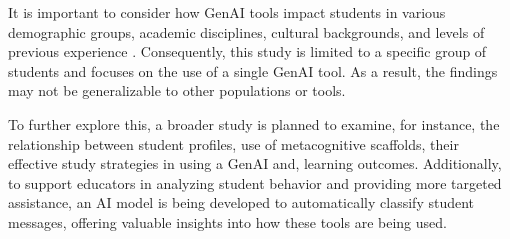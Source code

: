 \documentclass[a4paper,twoside]{article}
\begin{document}
It is important to consider how GenAI tools impact students in various
demographic groups, academic disciplines, cultural backgrounds, and levels of
previous experience \citep{catalan21} \citep{neo22}. Consequently, this study is
limited to a specific group of students and focuses on the use of a single GenAI
tool. As a result, the findings may not be generalizable to other populations or
tools.

To further explore this, a broader study is planned to examine, for instance,
the relationship between student profiles, use of metacognitive scaffolds, their
effective study strategies in using a GenAI and, learning outcomes.
Additionally, to support educators in analyzing student behavior and providing
more targeted assistance, an AI model is being developed to automatically
classify student messages, offering valuable insights into how these tools are
being used.


{\small
}
\end{document}
